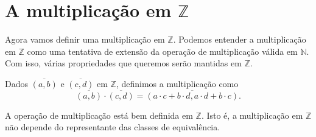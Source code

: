 \documentclass[../main.tex]{subfiles}
\begin{document}
\section{A multiplicação em $\mathbb{Z}$}
Agora vamos definir uma multiplicação em $\mathbb{Z}$. Podemos entender a multiplicação em $\mathbb{Z}$ como uma tentativa de extensão da operação de multiplicação válida em $\mathbb{N}$. Com isso, várias propriedades que queremos serão mantidas em $\mathbb{Z}$.
\begin{defi}\label{int-def-produto}
    Dados $\overline{(a,b)}$ e $\overline{(c,d)}$ em $\mathbb{Z}$, definimos a multiplicação como 
    \[ \overline{(a,b)} \cdot \overline{(c,d)} = \overline{(a \cdot c + b \cdot d, a \cdot d + b \cdot c)}. \]
\end{defi}
\begin{teo}\label{int-teo-produtoBemDefinido}
    A operação de multiplicação está bem definida em $\mathbb{Z}$. Isto é, a multiplicação em $\mathbb{Z}$ não depende do representante das classes de equivalência. 
\end{teo}
\end{document}
